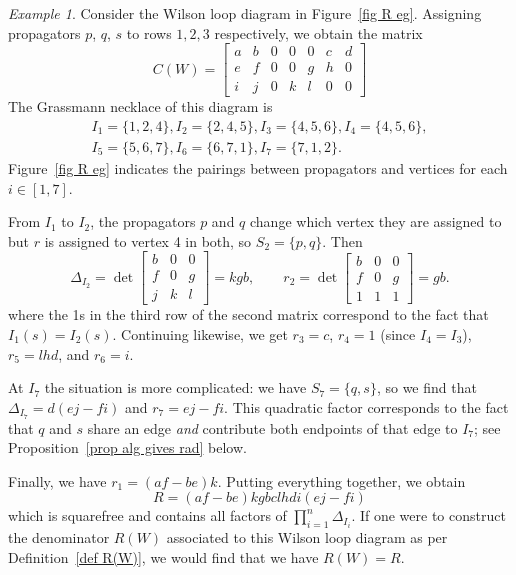 \documentclass[11pt]{article}
\theoremstyle{remark}
\newtheorem{eg}[thm]{Example}
\theoremstyle{definition}
\begin{document}
\begin{eg}
Consider the Wilson loop diagram in Figure~\ref{fig R eg}. Assigning propagators $p$, $q$, $s$ to rows $1,2,3$ respectively, we obtain the matrix
\[
C(W) = \begin{bmatrix} a & b & 0 & 0 & 0 & c & d \\ e & f & 0 & 0 & g & h & 0 \\ i & j & 0 & k & l & 0 & 0 \end{bmatrix}
\]
The Grassmann necklace of this diagram is 
\begin{gather*}I_1 = \{1,2,4\}, I_2 = \{2,4,5\}, I_3 = \{4,5,6\}, I_4=\{4,5,6\},\\ I_5=\{5,6,7\}, I_6 = \{6,7,1\}, I_7=\{7,1,2\}. \end{gather*}  
Figure~\ref{fig R eg} indicates the pairings between propagators and vertices for each $i \in [1,7]$.  

From $I_1$ to $I_2$, the propagators $p$ and $q$ change which vertex they are assigned to but $r$ is assigned to vertex 4 in both, so $S_2 = \{p,q\}$.  Then
\[
\Delta_{I_2}=\det\begin{bmatrix} b & 0 & 0 \\ f & 0 & g \\ j & k & l \end{bmatrix} = kgb, \qquad r_2 = \det\begin{bmatrix} b & 0 & 0 \\ f & 0 & g \\ 1 & 1 & 1 \end{bmatrix} = gb.
\]
where the 1s in the third row of the second matrix correspond to the fact that $I_1(s) = I_2(s)$.  Continuing likewise, we get $r_3 = c$, $r_4=1$ (since $I_4 = I_3$), $r_5 = lhd$, and $r_6 = i$.

At $I_7$ the situation is more complicated: we have $S_7 = \{q,s\}$, so we find that $\Delta_{I_7} = d(ej-fi)$ and $r_7 = ej-fi$. This quadratic factor corresponds to the fact that $q$ and $s$ share an edge {\em and} contribute both endpoints of that edge to $I_7$; see Proposition~\ref{prop alg gives rad} below.  

Finally, we have $r_1 = (af-be)k$.  Putting everything together, we obtain
\[
R = (af-be)kgbclhdi(ej-fi)
\]
which is squarefree and contains all factors of $\prod_{i=1}^{n}\Delta_{I_i}$. If one were to construct the denominator $R(W)$ associated to this Wilson loop diagram as per Definition~\ref{def R(W)}, we would find that we have $R(W) = R$.
\end{eg}
\end{document}

